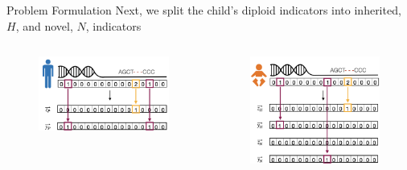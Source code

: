 \documentclass[10pt, t]{beamer}
\begin{document}
\begin{frame}{Problem Formulation}
Next, we split the child's diploid indicators into inherited, $H$, and novel, $N$, indicators 
	{\begin{center}
			\begin{columns}
				\begin{column}{0.49\textwidth}
					\begin{figure}
						\includegraphics[width=.9\linewidth]{imgs/parent_z_y_arrows.png}
					\end{figure}
				\end{column}
				\begin{column}{0.49\textwidth}
					\vspace{-5mm}
					\begin{figure}
						\includegraphics[width=.9\linewidth]{imgs/child_z_y_arrows.png}
					\end{figure}
				\end{column}
			\end{columns}
	\end{center}}
\end{frame}
\end{document}
